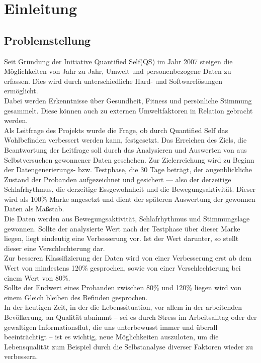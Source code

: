 
\chapter{Einleitung}
\label{ch:Einleitung}

\section{Problemstellung}
\label{ch:Einleitung:sec:Problemstellung}

Seit Gründung der Initiative Quantified Self(QS)\cite{web:QS} im Jahr 2007\cite{web:QSJahr} steigen die Möglichkeiten von Jahr zu Jahr, Umwelt und personenbezogene Daten zu erfassen. \cite{web:Tracking} 
Dies wird durch unterschiedliche Hard- und Softwarelösungen ermöglicht. \\
Dabei werden Erkenntnisse über Gesundheit, Fitness und persönliche Stimmung gesammelt.
Diese können auch zu externen Umweltfaktoren in Relation gebracht werden. \\
Als Leitfrage des Projekts wurde die Frage, ob durch Quantified Self das Wohlbefinden verbessert werden kann, festgesetzt. 
Das Erreichen des Ziels, die Beantwortung der Leitfrage soll durch das Analysieren und Auswerten von aus Selbstversuchen gewonnener Daten geschehen.
Zur Zielerreichung wird zu Beginn der Datengenerierungs- bzw. Testphase, die 30 Tage beträgt, der augenblickliche Zustand der Probanden aufgezeichnet und gesichert –– also der derzeitige Schlafrhythmus, die derzeitige Essgewohnheit und die Bewegungsaktivität.
Dieser wird als 100\% Marke angesetzt und dient der späteren Auswertung der gewonnen Daten als Maßstab. \\
Die Daten werden aus Bewegungsaktivität, Schlafrhythmus und Stimmungslage gewonnen.
Sollte der analysierte Wert nach der Testphase über dieser Marke liegen, liegt eindeutig eine Verbesserung vor. 
Ist der Wert darunter, so stellt dieser eine Verschlechterung dar. \\
Zur besseren Klassifizierung der Daten wird von einer Verbesserung erst ab dem Wert von mindestens 120\% gesprochen, sowie von einer Verschlechterung bei einem Wert von 80\%. \\Sollte der Endwert eines Probanden zwischen 80\% und 120\% liegen wird von einem Gleich bleiben des Befinden gesprochen.\\ 
In der heutigen Zeit, in der die Lebenssituation, vor allem in der arbeitenden Bevölkerung, an Qualität abnimmt – sei es durch Stress im Arbeitsalltag oder der gewaltigen Informationsflut, die uns unterbewusst immer und überall beeinträchtigt – ist es wichtig, neue Möglichkeiten auszuloten, um die Lebensqualität zum Beispiel durch die Selbstanalyse diverser Faktoren wieder zu verbessern. 

